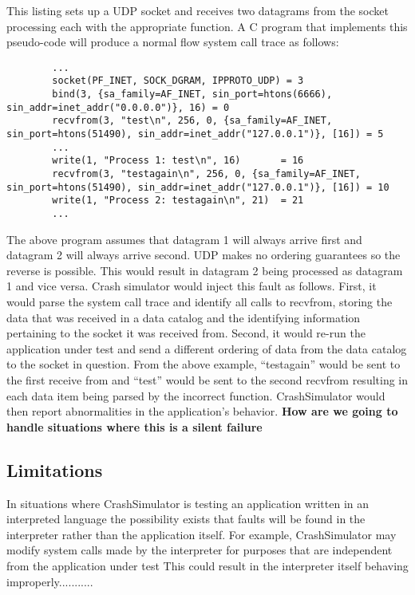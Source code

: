     This listing sets up a UDP socket and receives two datagrams from the socket processing each with the appropriate
    function. A C program that implements this pseudo-code will produce a normal flow system call trace as follows:

    \begin{verbatim}
        ...
        socket(PF_INET, SOCK_DGRAM, IPPROTO_UDP) = 3
        bind(3, {sa_family=AF_INET, sin_port=htons(6666), sin_addr=inet_addr("0.0.0.0")}, 16) = 0
        recvfrom(3, "test\n", 256, 0, {sa_family=AF_INET, sin_port=htons(51490), sin_addr=inet_addr("127.0.0.1")}, [16]) = 5
        ...
        write(1, "Process 1: test\n", 16)       = 16
        recvfrom(3, "testagain\n", 256, 0, {sa_family=AF_INET, sin_port=htons(51490), sin_addr=inet_addr("127.0.0.1")}, [16]) = 10
        write(1, "Process 2: testagain\n", 21)  = 21
        ...
    \end{verbatim}

    The above program assumes that datagram 1 will always arrive first and datagram 2 will always arrive second. UDP
    makes no ordering guarantees so the reverse is possible. This would result in datagram 2 being processed as datagram
    1 and vice versa. Crash simulator would inject this fault as follows. First, it would parse the system call trace
    and identify all calls to recvfrom, storing the data that was received in a data catalog and the identifying
    information pertaining to the socket it was received from. Second, it would re-run the application under test and
    send a different ordering of data from the data catalog to the socket in question. From the above example,
    ``testagain'' would be sent to the first receive from and ``test'' would be sent to the second recvfrom resulting in
    each data item being parsed by the incorrect function. CrashSimulator would then report abnormalities in the
    application's behavior. \textbf{How are we going to handle situations where this is a silent failure}

    \subsection{Limitations}

    In situations where CrashSimulator is testing an application written in an interpreted language the possibility
    exists that faults will be found in the interpreter rather than the application itself. For example, CrashSimulator
    may modify system calls made by the interpreter for purposes that are independent from the application under test
    This could result in the interpreter itself behaving improperly...........
